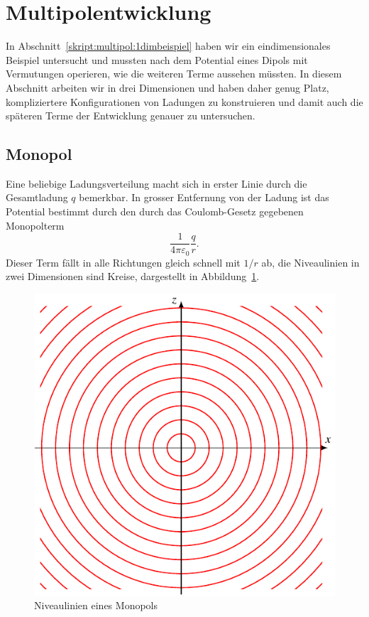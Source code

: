 %
%
%
\section{Multipolentwicklung}
In Abschnitt~\ref{skript:multipol:1dimbeispiel} haben wir ein
eindimensionales Beispiel untersucht und mussten nach dem Potential
eines Dipols mit Vermutungen operieren, wie die weiteren Terme aussehen
müssten.
In diesem Abschnitt arbeiten wir in drei Dimensionen und haben daher
genug Platz, kompliziertere Konfigurationen von Ladungen zu
konstruieren und damit auch die späteren Terme der Entwicklung
genauer zu untersuchen.

\subsection{Monopol}
%
Eine beliebige Ladungsverteilung macht sich in erster Linie durch
die Gesamtladung $q$ bemerkbar.
In grosser Entfernung von der Ladung ist das Potential bestimmt durch
den durch das Coulomb-Gesetz gegebenen Monopolterm
\[
\frac{1}{4\pi\varepsilon_0}\frac{q}{r}.
\]
Dieser Term fällt in alle Richtungen gleich schnell mit $1/r$ ab,
die Niveaulinien in zwei Dimensionen sind Kreise, dargestellt in
Abbildung~\ref{skript:multipol:monopol}.
\begin{figure}
\centering
\includegraphics{chapters/tikz/monopol.pdf}
\caption{Niveaulinien eines Monopols%
\label{skript:multipol:monopol}}
\end{figure}


